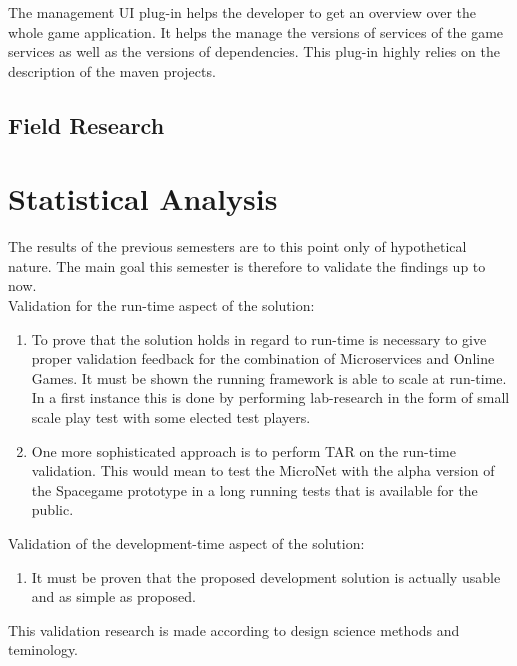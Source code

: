 The management UI plug-in helps the developer to get an overview over the whole
game application. It helps the manage the versions of services of the game
services as well as the versions of dependencies. This plug-in highly relies on
the description of the maven projects.

\subsection{Field Research}

\section{Statistical Analysis}

The results of the previous semesters are to this point only of hypothetical
nature. The main goal this semester is therefore to validate the findings up to
now.\\

Validation for the run-time aspect of the solution:

\begin{enumerate}
  \item To prove that the solution holds in regard to run-time is necessary to
  give proper validation feedback for the combination of Microservices and
  Online Games. It must be shown the running framework is able to scale at
  run-time. In a first instance this is done by performing lab-research in the
  form of small scale play test with some elected test players.
  \item One more sophisticated approach is to perform TAR on the run-time
  validation. This would mean to test the MicroNet with the alpha version of the
  Spacegame prototype in a long running tests that is available for the public. 
\end{enumerate}

Validation of the development-time aspect of the solution:

\begin{enumerate}
  \item It must be proven that the proposed development solution is actually
  usable and as simple as proposed.
\end{enumerate}

This validation research is made according to design science methods and
teminology.